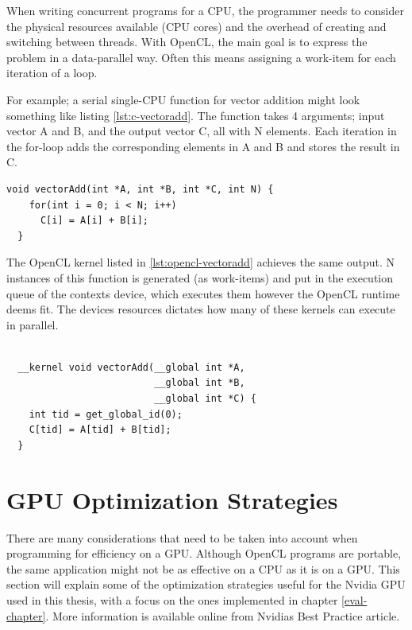 When writing concurrent programs for a CPU, the programmer needs to consider
the physical resources available (CPU cores) and the overhead of creating and
switching between threads. With OpenCL, the main goal is to express the
problem in a data-parallel way. Often this means assigning a work-item for
each iteration of a loop.

For example; a serial single-CPU function for vector addition might look
something like listing \ref{lst:c-vectoradd}. The function takes 4 arguments;
input vector A and B, and the output vector C, all with N elements. Each
iteration in the for-loop adds the corresponding elements in A and B and
stores the result in C.

\begin{lstlisting}[label={lst:c-vectoradd},caption=Serial C vector
    addition function]
  void vectorAdd(int *A, int *B, int *C, int N) {
    for(int i = 0; i < N; i++)
      C[i] = A[i] + B[i];
  }
\end{lstlisting}

The OpenCL kernel listed in \ref{lst:opencl-vectoradd} achieves the same
output. N instances of this function is generated (as work-items) and put in
the execution queue of the contexts device, which executes them however the
OpenCL runtime deems fit. The devices resources dictates how many of these
kernels can execute in parallel.

\begin{lstlisting}[label={lst:opencl-vectoradd}, caption=OpenCL kernel
    for vector addition]

  __kernel void vectorAdd(__global int *A,
                          __global int *B,
                          __global int *C) {
    int tid = get_global_id(0);
    C[tid] = A[tid] + B[tid];
  }
\end{lstlisting}


\section{GPU Optimization Strategies}

There are many considerations that need to be taken into account when
programming for efficiency on a GPU. Although OpenCL programs are portable,
the same application might not be as effective on a CPU as it is on a GPU.
This section will explain some of the optimization strategies useful for the
Nvidia GPU used in this thesis, with a focus on the ones implemented in
chapter \ref{eval-chapter}. More information is available online from Nvidias
Best Practice article\cite{nvidia-best-practice}.


